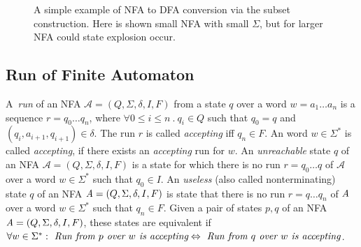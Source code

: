 \begin{figure}[h]
\begin{center}
\end{center}
	\caption{A simple example of NFA to DFA conversion via the subset construction. 
    Here is shown small NFA with small $\Sigma$, but for larger NFA could state explosion occur.}
    \label{pic_sub}
	\end{figure}



	\subsection{Run of Finite Automaton}
	\label{defRun}
  A~\emph{run} of an NFA $\mathcal{A}=(Q,\Sigma,\delta,I,F)$ from a state $q$
  over a word $w=a_1\ldots a_n$ is a sequence $r = q_0 \ldots q_n$, where $\forall 0\leq i \leq n\ .\ q_i\in Q$ 
  such that $q_0=q$ and $(q_i,a_{i+1},q_{i+1})\in \delta$. 
  The run $r$ is called \emph{accepting} iff $q_n \in F$. 
	An word $w \in \Sigma^{*}$ is called \emph{accepting}, if there exists an \emph{accepting} run for $w$.
  An \emph{unreachable} state $q$ of an NFA $\mathcal{A}=(Q,\Sigma,\delta,I,F)$ is a state for which there is no run $r=q_0\ldots q$ of 
  $\mathcal{A}$ over a word $w \in \Sigma^{*}$ 
  such that $q_0\in I$.
  An \emph{useless} (also called nonterminating) state $q$ of an NFA $\emph{A}=(Q,\Sigma,\delta,I,F)$ is state that there is no run $r=q\ldots q_n$ 
  of $\emph{A}$ over a word
  $w \in \Sigma^{*}$ such that $q_n \in F$.
  Given a pair of states $p,q$ of an NFA $\emph{A}=(Q,\Sigma,\delta,I,F)$, these states are equivalent if 
  $\forall w \in \Sigma^{*}: \emph{ Run from } p \emph{ over } w \emph{ is accepting} \Leftrightarrow 
			\emph{ Run from } q \emph{ over } w \emph{ is accepting}$.

